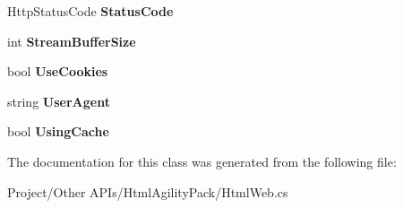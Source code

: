 \begin{DoxyCompactItemize}
\item 
\mbox{\label{class_html_agility_pack_1_1_html_web_a987c0accddc24be0792807bdec584b55}} 
Http\+Status\+Code {\bfseries Status\+Code}
\item 
\mbox{\label{class_html_agility_pack_1_1_html_web_a80df8e74a22d9aa8d8d28bc978820d9e}} 
int {\bfseries Stream\+Buffer\+Size}
\item 
\mbox{\label{class_html_agility_pack_1_1_html_web_a91e4fac63eecfef7df6c0825e518bd59}} 
bool {\bfseries Use\+Cookies}
\item 
\mbox{\label{class_html_agility_pack_1_1_html_web_a492089f2da916c27e99fb6bb732938df}} 
string {\bfseries User\+Agent}
\item 
\mbox{\label{class_html_agility_pack_1_1_html_web_a4937827277fc08dacaef28144d2e48b5}} 
bool {\bfseries Using\+Cache}
\end{DoxyCompactItemize}


The documentation for this class was generated from the following file\+:\begin{DoxyCompactItemize}
\item 
Project/\+Other A\+P\+Is/\+Html\+Agility\+Pack/Html\+Web.\+cs\end{DoxyCompactItemize}
